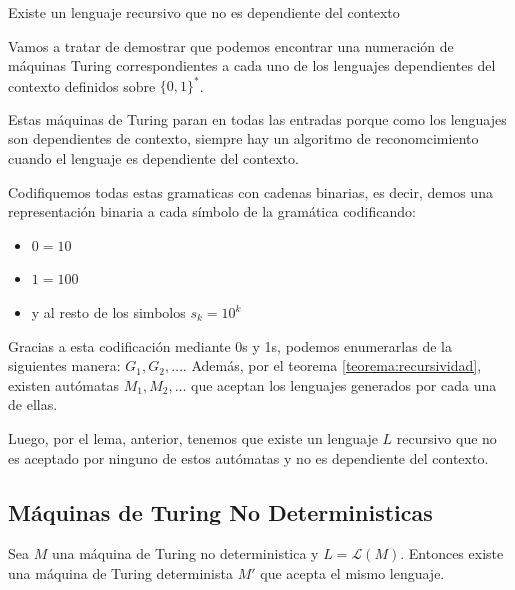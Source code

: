 \begin{lemma}
  Existe un lenguaje recursivo que no es dependiente del contexto
\end{lemma}
\begin{demo}[0.8\textwidth]
  Vamos a tratar de demostrar que podemos encontrar una numeración de máquinas Turing correspondientes a cada uno de los lenguajes dependientes del contexto definidos sobre \(\{0,1\}^*\).
\end{demo}
\begin{demoPart}[0.8\textwidth]
  Estas máquinas de Turing paran en todas las entradas porque como los lenguajes son dependientes de contexto, siempre hay un algoritmo de reconomcimiento cuando el lenguaje es dependiente del contexto.

  Codifiquemos todas estas gramaticas con cadenas binarias, es decir, demos una representación binaria a cada símbolo de la gramática codificando:

  \begin{itemize}
    \item \(0 = 10\)
    \item \(1 = 100\)
    \item y al resto de los simbolos \(s_k = 10^k\)
  \end{itemize}

  Gracias a esta codificación mediante 0s y 1s, podemos enumerarlas de la siguientes manera: \(G_1,G_2,\dots\). Además, por el teorema \ref{teorema:recursividad}, existen autómatas \(M_1, M_2,\dots\) que aceptan los lenguajes generados por cada una de ellas.

  Luego, por el lema, anterior, tenemos que existe un lenguaje \(L\) recursivo que no es aceptado por ninguno de estos autómatas y no es dependiente del contexto.
\end{demoPart}
\subsection{Máquinas de Turing No Deterministicas}
\begin{teorema}
  Sea \(M\) una máquina de Turing no deterministica y \(L = \mathcal{L}(M)\). Entonces existe una máquina de Turing determinista \(M'\) que acepta el mismo lenguaje.
\end{teorema}

